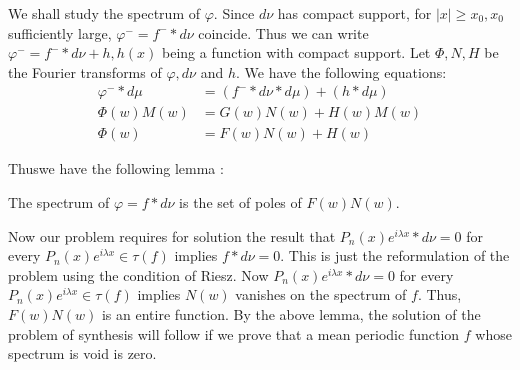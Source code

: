 We shall study the spectrum of $\varphi$. Since $d \nu$ has compact
support, for $| x | \geq x_0, x_0$ sufficiently large, $\varphi^{-} =
f^{-} * d\nu$ coincide. Thus we can write $\varphi^{-} = f^{-} * d\nu
+ h, h(x)$ being a function with compact support. Let $\Phi, N, H$
be the Fourier transforms of $\varphi, d \nu$ and $h$. We have the
following equations: 
\begin{align*}
  \varphi^{-} * d \mu &= (f^{-} * d\nu * d\mu ) + (h * d \mu )\\
  \Phi (w) M(w) &= G(w) N(w) + H(w) M(w) \\
  \Phi (w) &= F(w) N (w) + H(w)
\end{align*}

Thus\pageoriginale we have the following lemma :
\begin{lemma*}
 The spectrum of $\varphi = f * d\nu$ is the set of poles of $F(w) N (w)$.
\end{lemma*}

Now our problem requires for solution the result that $P_n (x) e^{i
 \lambda x} * d \nu = 0$ for every $P_n(x) e^{i \lambda x } \in \tau
(f)$ implies $f * d \nu = 0$. This is just the reformulation of the
problem using the condition of Riesz. Now $P_n (x) e^{i \lambda x} * d
\nu = 0$ for every $P_n (x) e^{i \lambda x} \in \tau (f)$ implies
$N(w)$ vanishes on the spectrum of $f$. Thus, $F(w) N(w)$ is an entire
function. By the above lemma, the solution of the problem of synthesis
will follow if we prove that a mean periodic function $f$ whose
spectrum is void is zero. 
